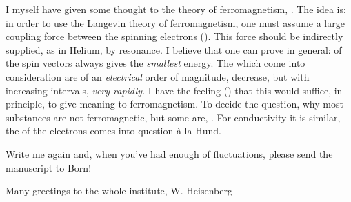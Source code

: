 I myself have given some thought to the theory of ferromagnetism, . The idea is: in order to use the Langevin theory of ferromagnetism, one must assume a large coupling force between the spinning electrons (). This force should be indirectly supplied, as in Helium, by resonance. I believe that one can prove in general:  of the spin vectors always gives the \textit{smallest} energy. The  which come into consideration are of an \textit{electrical} order of magnitude, decrease, but with increasing intervals, \textit{very rapidly}. I have the feeling () that this would suffice, in principle, to give meaning to ferromagnetism. To decide the question, why most substances are not ferromagnetic, but some are, . For conductivity it is similar, the  of the electrons comes into question \`a la Hund.

Write me again and, when you've had enough of fluctuations, please send the manuscript to Born!

Many greetings to the whole institute,
W. Heisenberg
